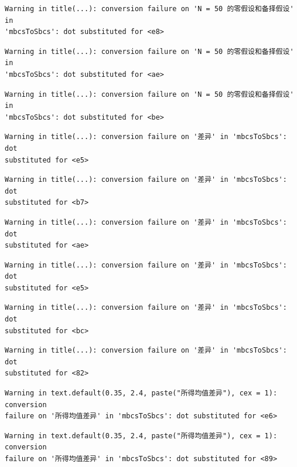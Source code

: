 \documentclass[
  letterpaper,
  DIV=11,
  numbers=noendperiod]{scrreprt}
\begin{document}
\begin{verbatim}
Warning in title(...): conversion failure on 'N = 50 的零假设和备择假设' in
'mbcsToSbcs': dot substituted for <e8>
\end{verbatim}

\begin{verbatim}
Warning in title(...): conversion failure on 'N = 50 的零假设和备择假设' in
'mbcsToSbcs': dot substituted for <ae>
\end{verbatim}

\begin{verbatim}
Warning in title(...): conversion failure on 'N = 50 的零假设和备择假设' in
'mbcsToSbcs': dot substituted for <be>
\end{verbatim}

\begin{verbatim}
Warning in title(...): conversion failure on '差异' in 'mbcsToSbcs': dot
substituted for <e5>
\end{verbatim}

\begin{verbatim}
Warning in title(...): conversion failure on '差异' in 'mbcsToSbcs': dot
substituted for <b7>
\end{verbatim}

\begin{verbatim}
Warning in title(...): conversion failure on '差异' in 'mbcsToSbcs': dot
substituted for <ae>
\end{verbatim}

\begin{verbatim}
Warning in title(...): conversion failure on '差异' in 'mbcsToSbcs': dot
substituted for <e5>
\end{verbatim}

\begin{verbatim}
Warning in title(...): conversion failure on '差异' in 'mbcsToSbcs': dot
substituted for <bc>
\end{verbatim}

\begin{verbatim}
Warning in title(...): conversion failure on '差异' in 'mbcsToSbcs': dot
substituted for <82>
\end{verbatim}

\begin{verbatim}
Warning in text.default(0.35, 2.4, paste("所得均值差异"), cex = 1): conversion
failure on '所得均值差异' in 'mbcsToSbcs': dot substituted for <e6>
\end{verbatim}

\begin{verbatim}
Warning in text.default(0.35, 2.4, paste("所得均值差异"), cex = 1): conversion
failure on '所得均值差异' in 'mbcsToSbcs': dot substituted for <89>
\end{verbatim}
\end{document}
